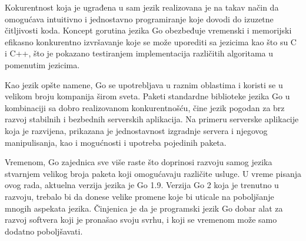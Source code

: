 \documentclass[12pt,oneside]{memoir}
\begin{document}
Kokurentnost koja je ugrađena u sam jezik realizovana je na takav način da omogućava intuitivno i jednostavno programiranje koje dovodi do izuzetne čitljivosti koda. Koncept gorutina jezika Go obezbeđuje vremenski i memorijski efikasno konkurentno izvršavanje koje se može uporediti sa jezicima kao što su C i C++, što je pokazano testiranjem implementacija različitih algoritama u pomenutim jezicima.

Kao jezik opšte namene, Go se upotrebljava u raznim oblastima i koristi se u velikom broju kompanija širom sveta. Paketi standardne biblioteke jezika Go u kombinaciji sa dobro realizovanom konkurentnošću, čine jezik pogodan za brz razvoj stabilnih i bezbednih serverskih aplikacija. Na primeru serverske aplikacije koja je razvijena, prikazana je jednostavnost izgradnje servera i njegovog manipulisanja, kao i mogućnosti i upotreba pojedinih paketa. 

Vremenom, Go zajednica sve više raste što doprinosi razvoju samog jezika stvarnjem velikog broja paketa koji omogućavaju različite usluge. U vreme pisanja ovog rada, aktuelna verzija jezika je Go 1.9. Verzija Go 2 koja je trenutno u razvoju, trebalo bi da donese velike promene koje bi uticale na poboljšanje mnogih aspekata jezika. Činjenica je da je programski jezik Go dobar alat za razvoj softvera koji je pronašao svoju svrhu, i koji se vremenom može samo dodatno poboljšavati.


\printbibliography 
\backmatter
\end{document}
